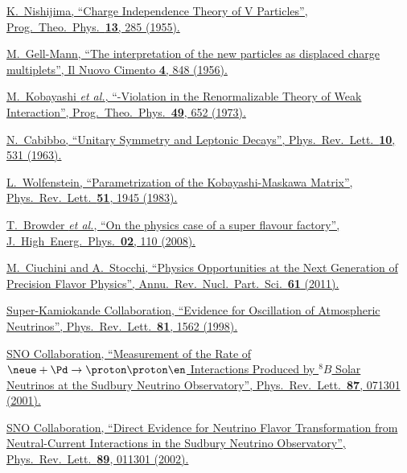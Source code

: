 \href{https://doi.org/10.1143/PTP.13.285}{K.~Nishijima, \enquote{Charge Independence Theory of V Particles}, Prog.\ Theo.\ Phys.\ \textbf{13}, 285 (1955).}

\href{https://doi.org/10.1007/BF02748000}{M.~Gell-Mann, \enquote{The interpretation of the new particles as displaced charge multiplets}, Il Nuovo Cimento \textbf{4}, 848 (1956).}

\href{https://doi.org/10.1143/PTP.49.652}{M.~Kobayashi \textit{et al.}, \enquote{\CP-Violation in the Renormalizable Theory of Weak Interaction}, Prog.\ Theo.\ Phys.\ \textbf{49}, 652 (1973).}

\href{https://doi.org/10.1103/PhysRevLett.10.531}{N.~Cabibbo, \enquote{Unitary Symmetry and Leptonic Decays}, Phys.\ Rev.\ Lett.\ \textbf{10}, 531 (1963).}

\href{https://doi.org/10.1103/PhysRevLett.51.1945}{L.~Wolfenstein, \enquote{Parametrization of the Kobayashi-Maskawa Matrix}, Phys.\ Rev.\ Lett.\ \textbf{51}, 1945 (1983).}

\href{https://doi.org/10.1088/1126-6708/2008/02/110}{T.~Browder \textit{et al.}, \enquote{On the physics case of a super flavour factory}, J.\ High\ Energ.\ Phys.\ \textbf{02}, 110 (2008).}

\href{https://doi.org/10.1146/annurev-nucl-102010-130424}{M.~Ciuchini and A.~Stocchi, \enquote{Physics Opportunities at the Next Generation of Precision Flavor Physics}, Annu.\ Rev.\ Nucl.\ Part.\ Sci.\ \textbf{61} (2011).}

\href{https://doi.org/10.1103/PhysRevLett.81.1562}{Super-Kamiokande Collaboration, \enquote{Evidence for Oscillation of Atmospheric Neutrinos}, Phys.\ Rev.\ Lett.\ \textbf{81}, 1562 (1998).}

\href{https://doi.org/10.1103/PhysRevLett.87.071301}{SNO Collaboration, \enquote{Measurement of the Rate of $\neue + \Pd \to \proton \proton \en$ Interactions Produced by ${}^{8}\!B$ Solar Neutrinos at the Sudbury Neutrino Observatory}, Phys.\ Rev.\ Lett.\ \textbf{87}, 071301 (2001).}

\href{https://doi.org/10.1103/PhysRevLett.89.011301}{SNO Collaboration, \enquote{Direct Evidence for Neutrino Flavor Transformation from Neutral-Current Interactions in the Sudbury Neutrino Observatory}, Phys.\ Rev.\ Lett.\ \textbf{89}, 011301 (2002).}

